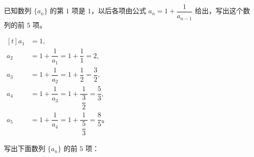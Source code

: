 \liti 已知数列 $\{a_n\}$ 的第 $1$ 项是 $1$，以后各项由公式 $a_n = 1 + \dfrac{1}{a_{n-1}}$
给出，写出这个数列的前 $5$ 项。

\jie $\begin{aligned}[t]
    a_1 &= 1, \\
    a_2 &= 1 + \dfrac{1}{a_1} = 1 + \dfrac{1}{1} =  2, \\
    a_3 &= 1 + \dfrac{1}{a_2} = 1 + \dfrac{1}{2} = \dfrac{3}{2}, \\
    a_4 &= 1 + \dfrac{1}{a_3} = 1 + \dfrac{\;1\;}{\dfrac{3}{2}} = \dfrac{5}{3}, \\
    a_5 &= 1 + \dfrac{1}{a_4} = 1 + \dfrac{\;1\;}{\dfrac{5}{3}} = \dfrac{8}{5} \text{。}
\end{aligned}$

\lianxi

写出下面数列 $\{a_n\}$ 的前 $5$ 项：

\begin{xiaotis}
\setcounter{cntxiaoti}{0}





\end{xiaotis}

